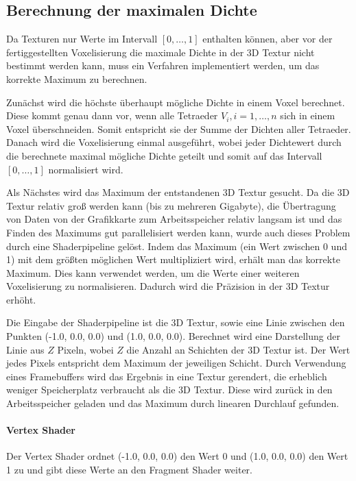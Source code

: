 \documentclass[a4paper,fontsize=12pt,toc=bib,halfparskip]{scrartcl}
\begin{document}
\subsection{Berechnung der maximalen Dichte}

Da Texturen nur Werte im Intervall $[0,\dots,1]$ enthalten k\"onnen, aber vor der fertiggestellten Voxelisierung die maximale Dichte in der 3D Textur nicht bestimmt werden kann, muss ein Verfahren implementiert werden, um das korrekte Maximum zu berechnen.

Zun\"achst wird die h\"ochste \"uberhaupt m\"ogliche Dichte in einem Voxel berechnet. Diese kommt genau dann vor, wenn alle Tetraeder $V_i, i=1,\dots,n$ sich in einem Voxel \"uberschneiden. Somit entspricht sie der Summe der Dichten aller Tetraeder. Danach wird die Voxelisierung einmal ausgef\"uhrt, wobei jeder Dichtewert durch die berechnete maximal m\"ogliche Dichte geteilt und somit auf das Intervall $[0,\dots,1]$ normalisiert wird. 

Als N\"achstes wird das Maximum der entstandenen 3D Textur gesucht. Da die 3D Textur relativ gro{\ss} werden kann (bis zu mehreren Gigabyte), die \"Ubertragung von Daten von der Grafikkarte zum Arbeitsspeicher relativ langsam ist und das Finden des Maximums gut parallelisiert werden kann, wurde auch dieses Problem durch eine Shaderpipeline gel\"ost. Indem das Maximum (ein Wert zwischen 0 und 1) mit dem gr\"o{\ss}ten m\"oglichen Wert multipliziert wird, erh\"alt man das korrekte Maximum. Dies kann verwendet werden, um die Werte einer weiteren Voxelisierung zu normalisieren. Dadurch wird die Pr\"azision in der 3D Textur erh\"oht.

Die Eingabe der Shaderpipeline ist die 3D Textur, sowie eine Linie zwischen den Punkten (-1.0, 0.0, 0.0) und (1.0, 0.0, 0.0). Berechnet wird eine Darstellung der Linie aus $Z$ Pixeln, wobei $Z$ die Anzahl an Schichten der 3D Textur ist. Der Wert jedes Pixels entspricht dem Maximum der jeweiligen Schicht. Durch Verwendung eines Framebuffers wird das Ergebnis in eine Textur gerendert, die erheblich weniger Speicherplatz verbraucht als die 3D Textur. Diese wird zur\"uck in den Arbeitsspeicher geladen und das Maximum durch linearen Durchlauf gefunden.

\paragraph{Vertex Shader}
Der Vertex Shader ordnet (-1.0, 0.0, 0.0) den Wert 0 und (1.0, 0.0, 0.0) den Wert 1 zu und gibt diese Werte an den Fragment Shader weiter.
\end{document}
